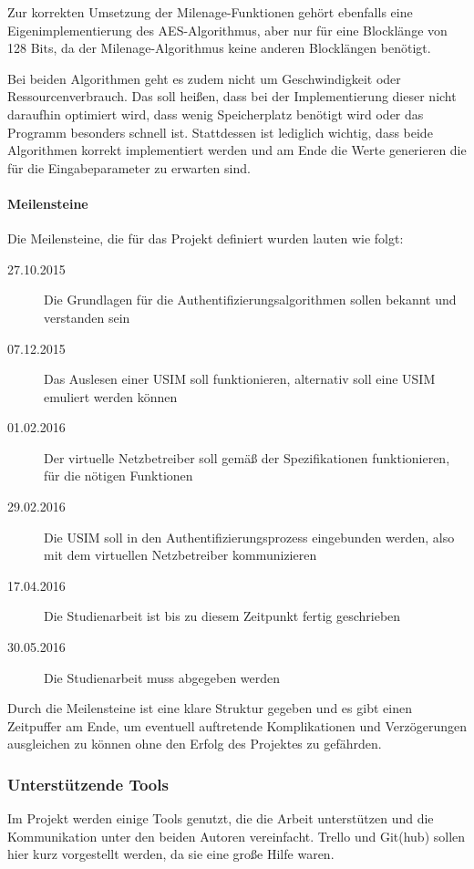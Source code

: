  Zur korrekten Umsetzung der Milenage-Funktionen gehört ebenfalls eine Eigen\-implementierung
 des AES-Algorithmus, aber nur für eine Blocklänge von 128 Bits, da der Milenage-Algorithmus
 keine anderen Blocklängen benötigt.
 
 Bei beiden Algorithmen geht es zudem nicht um Geschwindigkeit oder Ressourcenverbrauch.
 Das soll heißen, dass bei der Implementierung dieser nicht daraufhin optimiert wird, dass wenig
 Speicherplatz benötigt wird oder das Programm besonders schnell ist. Stattdessen ist lediglich
 wichtig, dass beide Algorithmen korrekt implementiert werden und am Ende die Werte generieren
 die für die Eingabeparameter zu erwarten sind.
 
 \paragraph{Meilensteine} Die Meilensteine, die für das Projekt definiert wurden lauten wie folgt:
 \begin{description}
 \item [27.10.2015] Die Grundlagen für die Authentifizierungs\-algorithmen sollen bekannt und verstanden sein
 \item [07.12.2015] Das Auslesen einer USIM soll funktionieren, alternativ soll eine USIM emuliert werden können
 \item [01.02.2016] Der virtuelle Netzbetreiber soll gemäß der Spezifikationen funktionieren, für die nötigen Funktionen
 \item [29.02.2016] Die USIM soll in den Authentifizierungsprozess eingebunden werden, also mit dem virtuellen Netzbetreiber kommunizieren
 \item [17.04.2016] Die Studienarbeit ist bis zu diesem Zeitpunkt fertig geschrieben
 \item [30.05.2016] Die Studienarbeit muss abgegeben werden
 \end{description}
 
 Durch die Meilensteine ist eine klare Struktur gegeben und es gibt einen Zeitpuffer am Ende,
 um eventuell auftretende Komplikationen und Verzögerungen ausgleichen zu können ohne den
 Erfolg des Projektes zu gefährden.

 \subsubsection{Unterstützende Tools}
  Im Projekt werden einige Tools genutzt, die die Arbeit unterstützen und die Kommunikation
  unter den beiden Autoren vereinfacht. Trello und Git(hub) sollen hier kurz vorgestellt werden,
  da sie eine große Hilfe waren.

